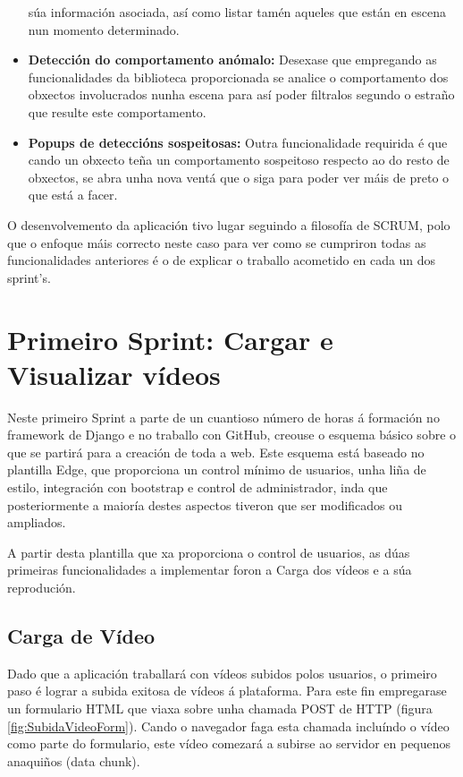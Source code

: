 \begin{itemize}
        súa información asociada, así como listar tamén aqueles que están en escena nun momento 
        determinado.
     \item \textbf{Detección do comportamento anómalo:} Desexase que empregando as funcionalidades
        da biblioteca proporcionada se analice o comportamento dos obxectos involucrados nunha 
        escena para así poder filtralos segundo o estraño que resulte este comportamento.
     \item \textbf{Popups de deteccións sospeitosas:} Outra funcionalidade requirida é que cando un
        obxecto teña un comportamento sospeitoso respecto ao do resto de obxectos, se abra unha nova
        ventá que o siga para poder ver máis de preto o que está a facer.
    \end{itemize}

O desenvolvemento da aplicación tivo lugar seguindo a filosofía de SCRUM, polo que o enfoque máis 
correcto neste caso para ver como se cumpriron todas as funcionalidades anteriores é o de explicar 
o traballo acometido en cada un dos sprint's.
  
\section{Primeiro Sprint: Cargar e Visualizar vídeos}
    Neste primeiro Sprint a parte de un cuantioso número de horas á formación no framework de Django
    e no traballo con GitHub, creouse o esquema básico sobre o que se partirá para a creación de toda a
    web. Este esquema está baseado no plantilla Edge\cite{edge-template}, que proporciona un control 
    mínimo de usuarios, unha liña de estilo, integración con bootstrap e control de administrador,
    inda que posteriormente a maioría destes aspectos tiveron que ser modificados ou ampliados.
    
    A partir desta plantilla que xa proporciona o control de usuarios, as dúas primeiras 
    funcionalidades a implementar foron a Carga dos vídeos e a súa reprodución.
    
    \subsection{Carga de Vídeo}
        Dado que a aplicación traballará con vídeos subidos polos usuarios, o primeiro paso é lograr
        a subida exitosa de vídeos á plataforma. Para este fin empregarase un formulario HTML que 
        viaxa sobre unha chamada POST de HTTP (figura \ref{fig:SubidaVideoForm}). 
        Cando o navegador faga esta chamada incluíndo o vídeo como parte do formulario, este vídeo
        comezará a subirse ao servidor en pequenos anaquiños (data chunk).
        
